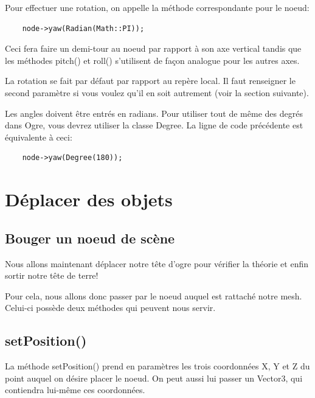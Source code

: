 \documentclass[10pt,a4paper]{report}
\begin{document}
Pour effectuer une rotation, on appelle la m\'ethode correspondante pour le noeud:
\begin{lstlisting}
	node->yaw(Radian(Math::PI));
\end{lstlisting}

Ceci fera faire un demi-tour au noeud par rapport \`{a} son axe vertical tandis que les m\'ethodes pitch() et roll() s'utilisent de fa\c{c}on analogue pour les autres axes.

La rotation se fait par d\'efaut par rapport au rep\`ere local. Il faut renseigner le second param\`etre si vous voulez qu'il en soit autrement (voir la section suivante).

Les angles doivent \^etre entr\'es en radians. Pour utiliser tout de m\^eme des degr\'es dans Ogre, vous devrez utiliser la classe Degree. La ligne de code pr\'ec\'edente est \'equivalente \`{a} ceci:
\begin{lstlisting}
	node->yaw(Degree(180));
\end{lstlisting}









\section{D\'eplacer des objets}




\subsection{Bouger un noeud de sc\`ene}

Nous allons maintenant d\'eplacer notre t\^ete d'ogre pour v\'erifier la th\'eorie et enfin sortir notre t\^ete de terre!

Pour cela, nous allons donc passer par le noeud auquel est rattach\'e notre mesh. Celui-ci poss\`ede deux m\'ethodes qui peuvent nous servir.




\subsection{setPosition()}

La m\'ethode setPosition() prend en param\`etres les trois coordonn\'ees X, Y et Z du point auquel on d\'esire placer le noeud. On peut aussi lui passer un Vector3, qui contiendra lui-m\^eme ces coordonn\'ees.
\end{document}
